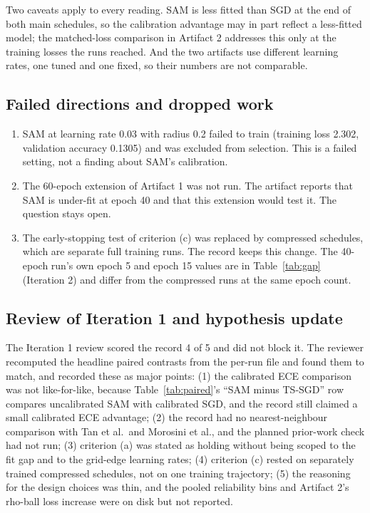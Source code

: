 \documentclass[11pt,letterpaper]{article}
\begin{document}
Two caveats apply to every reading. SAM is less fitted than SGD at the end of both main schedules, so the calibration advantage may in part reflect a less-fitted model; the matched-loss comparison in Artifact 2 addresses this only at the training losses the runs reached. And the two artifacts use different learning rates, one tuned and one fixed, so their numbers are not comparable.

\subsection{Failed directions and dropped work}

\begin{enumerate}
\item SAM at learning rate 0.03 with radius 0.2 failed to train (training loss 2.302, validation accuracy 0.1305) and was excluded from selection. This is a failed setting, not a finding about SAM's calibration.
\item The 60-epoch extension of Artifact 1 was not run. The artifact reports that SAM is under-fit at epoch 40 and that this extension would test it. The question stays open.
\item The early-stopping test of criterion (c) was replaced by compressed schedules, which are separate full training runs. The record keeps this change. The 40-epoch run's own epoch 5 and epoch 15 values are in Table~\ref{tab:gap} (Iteration 2) and differ from the compressed runs at the same epoch count.
\end{enumerate}

\subsection{Review of Iteration 1 and hypothesis update}

The Iteration 1 review scored the record 4 of 5 and did not block it. The reviewer recomputed the headline paired contrasts from the per-run file and found them to match, and recorded these as major points: (1) the calibrated ECE comparison was not like-for-like, because Table~\ref{tab:paired}'s ``SAM minus TS-SGD'' row compares uncalibrated SAM with calibrated SGD, and the record still claimed a small calibrated ECE advantage; (2) the record had no nearest-neighbour comparison with Tan et al.\ and Morosini et al., and the planned prior-work check had not run; (3) criterion (a) was stated as holding without being scoped to the fit gap and to the grid-edge learning rates; (4) criterion (c) rested on separately trained compressed schedules, not on one training trajectory; (5) the reasoning for the design choices was thin, and the pooled reliability bins and Artifact 2's rho-ball loss increase were on disk but not reported.
\end{document}

